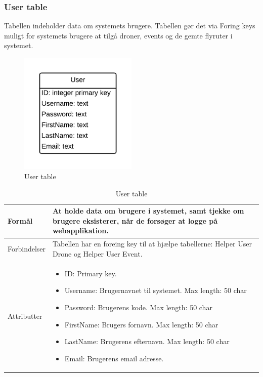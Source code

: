 \subsubsection*{User table}
Tabellen indeholder data om systemets brugere. Tabellen gør det via Foring keys muligt for systemets brugere at tilgå droner, events og de gemte flyruter i systemet.
\vspace{-5pt}
\begin{figure}[H]
	\centering
	\includegraphics[width=0.5\textwidth]{Billeder/database/UserTabel.png}
	\vspace{-5pt}
	\caption{User table}
	\label{fig:user_table}
\end{figure}

\begin{table}[H]
\begin{tabular}{| p{3cm}| p{11.5cm}|}
\hline

Formål	 							& At holde data om brugere i systemet, samt tjekke om brugere eksisterer, når de forsøger at logge på webapplikation.\\\hline
Forbindelser						& Tabellen har en foreing key til at hjælpe tabellerne: Helper User Drone og Helper User Event.\\\hline
Attributter						& \begin{itemize}
												\item ID: Primary key.
												\item Username: Brugernavnet til systemet. Max length: 50 char
												\item Password: Brugerens kode. Max length: 50 char
												\item FirstName: Brugers fornavn. Max length: 50 char
												\item LastName: Brugerens efternavn. Max length: 50 char
												\item Email: Brugerens email adresse.
											\end{itemize} \\\hline 
\end{tabular}
\caption{User table}
\label{tab:user_table}
\end{table}